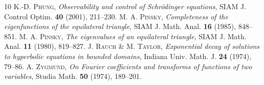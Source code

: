 \documentclass[a4paper,11pt]{amsart}
\numberwithin{equation}{section}
\theoremstyle{definition}
\begin{document}
\begin{thebibliography}{10}
	 K.-D. \textsc{Phung}, \textit{Observability and control of Schr\"odinger equations}, SIAM J. Control Optim. \textbf{40} (2001), 211--230.
	 M. A. \textsc{Pinsky}, \textit{Completeness of the eigenfunctions of the equilateral triangle}, SIAM J. Math. Anal. \textbf{16} (1985), 848--851.
	 M. A. \textsc{Pinsky}, \textit{The eigenvalues of an equilateral triangle}, SIAM J. Math. Anal. \textbf{11} (1980), 819--827.
	 J. \textsc{Rauch} \& M. \textsc{Taylor}, \textit{Exponential decay of solutions to hyperbolic equations in bounded domains}, Indiana Univ. Math. J. \textbf{24} (1974), 79--86.
	 A. \textsc{Zygmund}, \textit{On Fourier coefficients and transforms of functions of two variables}, Studia Math. \textbf{50} (1974), 189--201.
\end{thebibliography}
\end{document}
